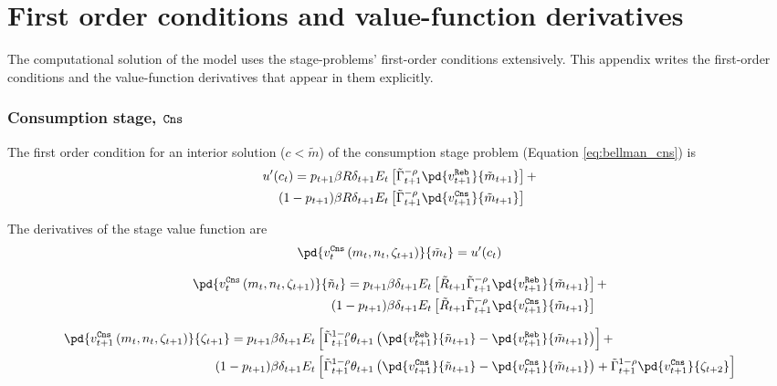 \documentclass[../RiskyContrib.tex]{subfiles}
\begin{document}
\section{First order conditions and value-function derivatives}

The computational solution of the model uses the stage-problems'
first-order conditions extensively. This appendix writes the
first-order conditions and the value-function derivatives that
appear in them explicitly.

\subsubsection{Consumption stage, $\mathtt{Cns}$}

The first order condition for an interior solution ($c < \tilde{m}$)
of the consumption stage problem (Equation \ref{eq:bellman_cns}) is
\begin{equation*}
\begin{split}
u'(c_t) = p_{t+1} &\beta R \delta_{t+1} E_t \left[ \tilde{\Gamma}_{t+1}^{-\rho} \pd{v^{\Reb}_{t+1}}{\tilde{m}_{t+1}}\right] +\\
\left(1-p_{t+1}\right) &\beta R \delta_{t+1} E_t\left[\tilde{\Gamma}_{t+1}^{-\rho} \pd{v^{\Cns}_{t+1}}{\tilde{m}_{t+1}} \right]
\end{split}
\end{equation*}

The derivatives of the stage value function are
\begin{equation}
\begin{split}
\pd{v^{\Cns}_{t}\left(m_{t}, 
n_{t}, \Contr_{t+1}\right)}{\tilde{m}_t} = u'(c_t)
\end{split}
\end{equation}

\begin{equation}
\begin{split}
\pd{v^{\Cns}_{t}\left(m_{t}, 
n_{t}, \Contr_{t+1}\right)}{\tilde{n}_t} = p_{t+1} &\beta \delta_{t+1} E_t \left[ \tilde{R}_{t+1}\tilde{\Gamma}_{t+1}^{-\rho} \pd{v^{\Reb}_{t+1}}{\tilde{m}_{t+1}}\right] +\\
\left(1-p_{t+1}\right) &\beta \delta_{t+1} E_t\left[\tilde{R}_{t+1} \tilde{\Gamma}_{t+1}^{-\rho} \pd{v^{\Cns}_{t+1}}{\tilde{m}_{t+1}} \right]
\end{split}
\end{equation}

\begin{equation}
\begin{split}
\pd{v^{\Cns}_{t+1}\left(m_{t}, 
n_{t}, \Contr_{t+1}\right)}{\Contr_{t+1}} = p_{t+1} &\beta \delta_{t+1} E_t \left[\tilde{\Gamma}_{t+1}^{1-\rho} \theta_{t+1} \left(\pd{v^{\Reb}_{t+1}}{\tilde{n}_{t+1}} - \pd{v^{\Reb}_{t+1}}{\tilde{m}_{t+1}}\right)\right] +\\
\left(1-p_{t+1}\right) &\beta \delta_{t+1} E_t\left[\tilde{\Gamma}_{t+1}^{1-\rho} \theta_{t+1} \left( \pd{v^{\Cns}_{t+1}}{\tilde{n}_{t+1}} - \pd{v^{\Cns}_{t+1}}{\tilde{m}_{t+1}} \right) + \tilde{\Gamma}_{t+1}^{1-\rho} \pd{v^{\Cns}_{t+1}}{\Contr_{t+2}}\right]
\end{split}
\end{equation}
\end{document}
